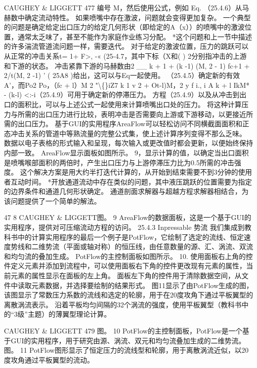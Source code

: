 \documentclass[UTF8,11pt,a4paper,openany,fontset=fandol]{ctexbook}
\begin{document}
CAUGHEY \& LIGGETT 477 编号 M，然后使用公式，例如 Eq. （25.4.6）从马赫数中确定流动特性。 如果喷嘴中存在激波，问题就会变得更加复杂。 一个典型的问题是确定给定出口压力的给定几何形状（即给定的A（x））的喷嘴中的激波位置，通常太乏味了，甚至不能作为家庭作业练习分配。 *这个问题和上一节中描述的许多湍流管道流问题一样，需要迭代。 对于给定的激波位置，压力的跳跃可以从正常的冲击关系t= 1+ F>, -« (25-4.7，其中下标（X和( ) 2分别指冲击的上游和下游的状态。 冲击紧靠下游的马赫数由2 \_\_ k + 1 + (k -1) (M, 2 - 1) fc+1 + 2/t(M, 2 -1) ' ( 25A8 )给出，这可以与Eq一起使用。 （25.4.5）确定新的有效A'，而Po2 Po，（fc + l）M 2 "\textbackslash\{\}iZ7 k 1 v 2 + Ot-l)M，2 y f i., i A k + l IkM* - (k-l) <:-i（25.4.9）可用于确定新的停滞压力。 方程（25.4.9）以及从冲击到出口的面积比，可以与上述公式一起使用来计算喷嘴出口处的压力。 将这种计算压力与所需的出口压力进行比较，表明冲击是否需要向上游或下游移动，以更接近所需的出口压力。 基于GUI的实用程序AreaFlow可以轻松访问不同横截面面积和正态冲击关系的管道中等熟流量的完整公式集，使上述计算序列变得不那么乏味。 数据以电子表格的形式输入和呈现，每次输入或更改值时都会更新，以便始终保持内部一致。 AreaFlow显示面板如图所示。 9，显示计算的值，以确定当出口面积是喷嘴喉部面积的两倍时，产生出口压力与上游停滞压力比为0.5所需的冲击强度。 这个解决方案是用大约半打迭代计算的，从开始到结束需要不到3分钟的使用者互动时间。 *开放通道流动中存在类似的问题，其中液压跳跃的位置需要为指定的边界条件和通道几何形状确定。 通道剖面求解器与超越方程求解器相结合，为该问题提供了一个简单的解法。

47 8 CAUGHEY \& LIGGETT图。 9 AreaFlow的数据面板，这是一个基于GUI的实用程序，提供对可压缩流动方程的访问。 25.4.3 Inpressable 势流 我们集成到教科书中的计算实用程序的最后一个例子是PotFlow，它绘制了选定的流线、恒定速度势线和二维势流（平面或轴对称）的恒压线，由任意数量的源、汇、涡流、双流和均匀流的叠加生成。 PotFlow的主控制面板如图所示。 10. 使用面板右上角的控件定义元素并添加到流程中，可以使用面板右下角的控件更改现有元素的属性，当前元素的属性显示在面板的左上角。 面板左下角的控件用于清除数据空间，从文件中读取元素数据，并选择要绘制的结果形式。 图11显示了由PotFlow生成的图，该图显示了常数压力系数的流线和选定的轮廓，用于在20度攻角下通过平板翼型的离散涡流表示。 沿着平板均匀间隔的32个涡流的强度，使用平板翼型（教科书中的“3级”主题）的薄翼型理论计算。

CAUGHEY \& LIGGETT 479 图。 10 PotFlow的主控制面板，PotFlow是一个基于GUI的实用程序，用于研究由源、涡流、双元和均匀流叠加生成的二维势流。 图。 11 PotFlow图形显示了恒定压力的流线型和轮廓，用于离散涡流近似，以20度攻角通过平板翼型的流动。
\end{document}
